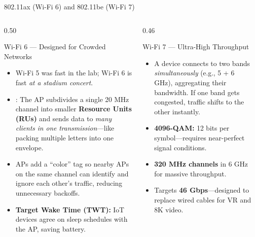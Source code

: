 \documentclass[aspectratio=169]{beamer}
\begin{document}
\begin{frame}{802.11ax (Wi-Fi 6) and 802.11be (Wi-Fi 7)}
    \begin{columns}[T]
        \begin{column}{0.50\textwidth}
            \begin{block}{Wi-Fi 6 --- Designed for Crowded Networks}
                \footnotesize
                \begin{itemize}
                    \item Wi-Fi 5 was fast in the lab; Wi-Fi 6 is fast \emph{at a stadium concert}.
                    \item {}: The AP subdivides a single 20 MHz channel into smaller \textbf{Resource Units (RUs)} and sends data to \emph{many clients in one transmission}---like packing multiple letters into one envelope.
                    \item {} APs add a ``color'' tag so nearby APs on the same channel can identify and ignore each other's traffic, reducing unnecessary backoffs.
                    \item \textbf{Target Wake Time (TWT):} IoT devices agree on sleep schedules with the AP, saving battery.
                \end{itemize}
            \end{block}
        \end{column}
        \begin{column}{0.46\textwidth}
            \begin{block}{Wi-Fi 7 --- Ultra-High Throughput}
                \footnotesize
                \begin{itemize}
                    \item {} A device connects to two bands \emph{simultaneously} (e.g., 5 + 6 GHz), aggregating their bandwidth. If one band gets congested, traffic shifts to the other instantly.
                    \item \textbf{4096-QAM:} 12 bits per symbol---requires near-perfect signal conditions.
                    \item \textbf{320 MHz channels} in 6 GHz for massive throughput.
                    \item Targets \textbf{46 Gbps}---designed to replace wired cables for VR and 8K video.
                \end{itemize}
            \end{block}
        \end{column}
    \end{columns}
\end{frame}
\end{document}
